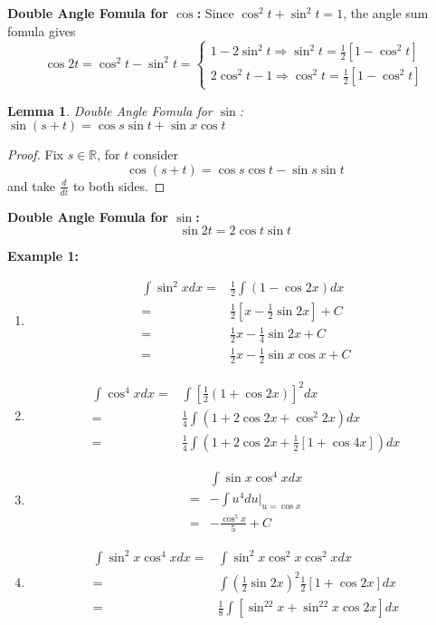 \documentclass[12pt]{article}
\theoremstyle{plain}
\newtheorem{lemma}{Lemma}[subsection]
\newcommand{\mR}{{\mathbb{R}}}
\begin{document}
\textbf{Double Angle Fomula for $\cos$: }
Since $\cos^2 t + \sin^2 t = 1$, the angle sum fomula gives
\[
	\cos 2t = \cos^2 t - \sin^2 t = 
	\begin{cases}
		1 - 2\sin^2 t \Rightarrow\sin^2 t = \frac12[1-\cos^2 t]\\
		2\cos^2 t - 1 \Rightarrow \cos^2 t = \frac12 [1-\cos^2 t]
	\end{cases}
\]

\begin{lemma}
	Double Angle Fomula for $\sin$: $\sin(s+t) = \cos s \sin t + \sin x
	\cos t$
\end{lemma}
\begin{proof}
	Fix $s \in \mR$, for $t$ consider
	\[
		\cos (s + t) = \cos s \cos t - \sin s \sin t
	\]
	and take $\frac d{dt}$ to both sides.
\end{proof}

\textbf{Double Angle Fomula for $\sin$: }
\[
	\sin 2t = 2\cos t \sin t
\]

{\color{Brown}
	\textbf{Example 1:}
	\begin{enumerate}
	\item 
		\begin{align*}
			\int \sin^2x dx
			=& \frac12 \int(1-\cos 2x) dx\\
			=& \frac12 [x-\frac12 \sin 2x] + C\\
			=& \frac12 x - \frac 14 \sin 2x + C\\
			=& \frac12 x - \frac12 \sin x \cos x + C
		\end{align*}

	\item
		\begin{align*}
			\int \cos^4 x dx 
			=& \int[\frac12(1+\cos 2x)]^2 dx\\
			=& \frac 14 \int (1+ 2\cos 2x + \cos^2 2x) dx\\
			=& \frac 14 \int (1+2\cos 2x + \frac12[1+\cos4x]) dx
		\end{align*}

	\item 
		\begin{align*}
			&\int \sin x \cos^4 x dx \tag{$u = \cos x, du = -\sin xdx$}\\
			=& - \int u^4 du\vert_{u=\cos x} \\
			=& -\frac{\cos^5 x}5 + C
		\end{align*}
		
	\item
		\begin{align*}
			\int \sin^2x \cos^4 x dx
			=& \int \sin^2x\cos^2x\cos^2xdx\\
			=& \int (\frac12\sin2x)^2 \frac12[1+\cos 2x]dx\\
			=& \frac 18 \int[\sin^22x + \sin^22x\cos 2x] dx
		\end{align*}
	\end{enumerate}
}
\end{document}
